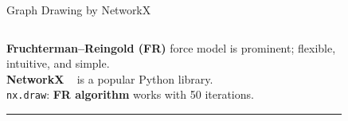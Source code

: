 \documentclass[dvipdfmx,13pt,aspectratio=169]{beamer}
\newcommand{\red}[1]{\textcolor{red}{#1}}
\newif\ifShowHidden
\begin{document}
\ifShowHidden
  \begin{frame}{Graph Drawing by NetworkX}
    \begin{columns}
      \begin{column}{0.62\columnwidth}
        \large{%
          \textbf{Fruchterman--Reingold (FR)} force model is prominent; flexible, intuitive, and simple.\\[1em]
          \textbf{NetworkX} ~\cite{hagberg2008exploring} is a popular Python library.\\
          \texttt{nx.draw}: \large{\textbf{FR algorithm}} works with 50 iterations.
        }
        \begin{center}
          \rule{0.8\columnwidth}{0.4pt}
        \end{center}
        \Large{
          \\
          \\
          \uncover<3->{$\abs{V}=500$: \red{11.5} sec / \red{WHAT IS THIS???}}
        }
      \end{column}
      \begin{column}{0.38\columnwidth}
        \begin{figure}[htbp]
          \centering

\end{figure}
\end{column}
\end{columns}
\end{frame}
\end{document}
